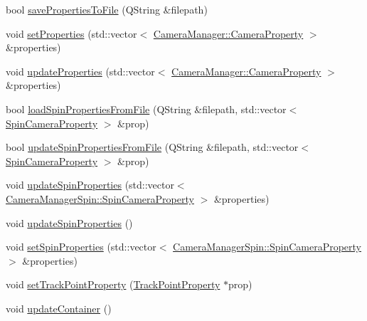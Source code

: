 \begin{DoxyCompactItemize}
\item 
bool \mbox{\hyperlink{class_abstract_camera_manager_a2a649f85fb8bfd333379204af3399e5a}{save\+Properties\+To\+File}} (Q\+String \&filepath)
\item 
void \mbox{\hyperlink{class_abstract_camera_manager_ac5c7ff3b69138df82efafa0400b50ce5}{set\+Properties}} (std\+::vector$<$ \mbox{\hyperlink{class_camera_manager_1_1_camera_property}{Camera\+Manager\+::\+Camera\+Property}} $>$ \&properties)
\item 
void \mbox{\hyperlink{class_abstract_camera_manager_aa9e2342648ea4b4683885a3f5658fd91}{update\+Properties}} (std\+::vector$<$ \mbox{\hyperlink{class_camera_manager_1_1_camera_property}{Camera\+Manager\+::\+Camera\+Property}} $>$ \&properties)
\item 
bool \mbox{\hyperlink{class_abstract_camera_manager_aaa967ad7d97960c28f38dba3a08b824d}{load\+Spin\+Properties\+From\+File}} (Q\+String \&filepath, std\+::vector$<$ \mbox{\hyperlink{class_camera_manager_spin_1_1_spin_camera_property}{Spin\+Camera\+Property}} $>$ \&prop)
\item 
bool \mbox{\hyperlink{class_abstract_camera_manager_a33b5b6ea968d18e5931ecbd38596fac8}{update\+Spin\+Properties\+From\+File}} (Q\+String \&filepath, std\+::vector$<$ \mbox{\hyperlink{class_camera_manager_spin_1_1_spin_camera_property}{Spin\+Camera\+Property}} $>$ \&prop)
\item 
void \mbox{\hyperlink{class_abstract_camera_manager_ab4d708f46438adc8cf886c8f5057d1a6}{update\+Spin\+Properties}} (std\+::vector$<$ \mbox{\hyperlink{class_camera_manager_spin_1_1_spin_camera_property}{Camera\+Manager\+Spin\+::\+Spin\+Camera\+Property}} $>$ \&properties)
\item 
void \mbox{\hyperlink{class_abstract_camera_manager_a26eac9ad8b2d2fe00bd557453c90d012}{update\+Spin\+Properties}} ()
\item 
void \mbox{\hyperlink{class_abstract_camera_manager_acc348fb5e89f17e0b80e9e591925d139}{set\+Spin\+Properties}} (std\+::vector$<$ \mbox{\hyperlink{class_camera_manager_spin_1_1_spin_camera_property}{Camera\+Manager\+Spin\+::\+Spin\+Camera\+Property}} $>$ \&properties)
\item 
void \mbox{\hyperlink{class_abstract_camera_manager_a81e28dcc4866f495816a99bcfad9fd21}{set\+Track\+Point\+Property}} (\mbox{\hyperlink{struct_track_point_property}{Track\+Point\+Property}} $\ast$prop)
\item 
void \mbox{\hyperlink{class_abstract_camera_manager_a419cecb816ee7fe4c3074f4f6a6d41f9}{update\+Container}} ()

\end{DoxyCompactItemize}
